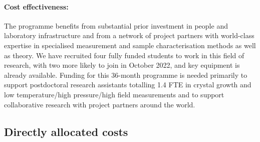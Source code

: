 \documentclass[prl,a4paper,11pt]{revtex4-2}
\begin{document}
\begin{singlespace}
%
\paragraph{Cost effectiveness:} The programme benefits from substantial prior investment in people and
laboratory infrastructure and from a network of project partners with world-class expertise in specialised measurement and sample characterisation methods as well as theory. 
We have recruited four fully funded students to
work in this %
field of research, with two more likely to join in October 2022,
and key equipment is already available.
Funding for this 36-month programme is needed primarily to support 
postdoctoral research assistants totalling 1.4 FTE in crystal growth and low temperature/high pressure/high field measurements and to support collaborative research with project partners around the world.

\subsection{Directly allocated costs}

\end{singlespace}
\end{document}
